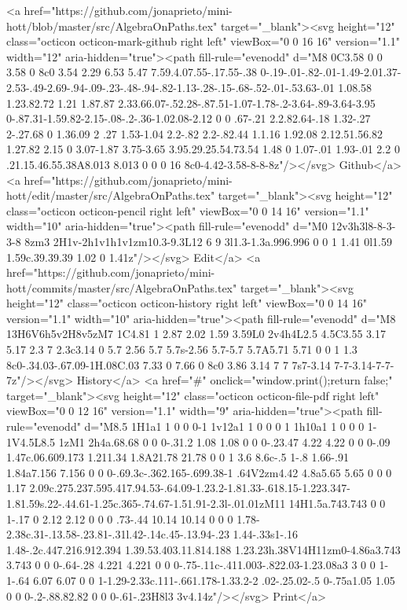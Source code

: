       <a href="https://github.com/jonaprieto/mini-hott/blob/master/src/AlgebraOnPaths.tex" target="_blank"><svg height="12" class="octicon octicon-mark-github right left" viewBox="0 0 16 16" version="1.1" width="12" aria-hidden="true"><path fill-rule="evenodd" d="M8 0C3.58 0 0 3.58 0 8c0 3.54 2.29 6.53 5.47 7.59.4.07.55-.17.55-.38 0-.19-.01-.82-.01-1.49-2.01.37-2.53-.49-2.69-.94-.09-.23-.48-.94-.82-1.13-.28-.15-.68-.52-.01-.53.63-.01 1.08.58 1.23.82.72 1.21 1.87.87 2.33.66.07-.52.28-.87.51-1.07-1.78-.2-3.64-.89-3.64-3.95 0-.87.31-1.59.82-2.15-.08-.2-.36-1.02.08-2.12 0 0 .67-.21 2.2.82.64-.18 1.32-.27 2-.27.68 0 1.36.09 2 .27 1.53-1.04 2.2-.82 2.2-.82.44 1.1.16 1.92.08 2.12.51.56.82 1.27.82 2.15 0 3.07-1.87 3.75-3.65 3.95.29.25.54.73.54 1.48 0 1.07-.01 1.93-.01 2.2 0 .21.15.46.55.38A8.013 8.013 0 0 0 16 8c0-4.42-3.58-8-8-8z"/></svg> Github</a>
      <a href="https://github.com/jonaprieto/mini-hott/edit/master/src/AlgebraOnPaths.tex" target="_blank"><svg height="12" class="octicon octicon-pencil right left" viewBox="0 0 14 16" version="1.1" width="10" aria-hidden="true"><path fill-rule="evenodd" d="M0 12v3h3l8-8-3-3-8 8zm3 2H1v-2h1v1h1v1zm10.3-9.3L12 6 9 3l1.3-1.3a.996.996 0 0 1 1.41 0l1.59 1.59c.39.39.39 1.02 0 1.41z"/></svg> Edit</a>
      <a href="https://github.com/jonaprieto/mini-hott/commits/master/src/AlgebraOnPaths.tex" target="_blank"><svg height="12" class="octicon octicon-history right left" viewBox="0 0 14 16" version="1.1" width="10" aria-hidden="true"><path fill-rule="evenodd" d="M8 13H6V6h5v2H8v5zM7 1C4.81 1 2.87 2.02 1.59 3.59L0 2v4h4L2.5 4.5C3.55 3.17 5.17 2.3 7 2.3c3.14 0 5.7 2.56 5.7 5.7s-2.56 5.7-5.7 5.7A5.71 5.71 0 0 1 1.3 8c0-.34.03-.67.09-1H.08C.03 7.33 0 7.66 0 8c0 3.86 3.14 7 7 7s7-3.14 7-7-3.14-7-7-7z"/></svg> History</a>
      <a  href="#" onclick="window.print();return false;" target="_blank"><svg height="12" class="octicon octicon-file-pdf right left" viewBox="0 0 12 16" version="1.1" width="9" aria-hidden="true"><path fill-rule="evenodd" d="M8.5 1H1a1 1 0 0 0-1 1v12a1 1 0 0 0 1 1h10a1 1 0 0 0 1-1V4.5L8.5 1zM1 2h4a.68.68 0 0 0-.31.2 1.08 1.08 0 0 0-.23.47 4.22 4.22 0 0 0-.09 1.47c.06.609.173 1.211.34 1.8A21.78 21.78 0 0 1 3.6 8.6c-.5 1-.8 1.66-.91 1.84a7.156 7.156 0 0 0-.69.3c-.362.165-.699.38-1 .64V2zm4.42 4.8a5.65 5.65 0 0 0 1.17 2.09c.275.237.595.417.94.53-.64.09-1.23.2-1.81.33-.618.15-1.223.347-1.81.59s.22-.44.61-1.25c.365-.74.67-1.51.91-2.3l-.01.01zM11 14H1.5a.743.743 0 0 1-.17 0 2.12 2.12 0 0 0 .73-.44 10.14 10.14 0 0 0 1.78-2.38c.31-.13.58-.23.81-.31l.42-.14c.45-.13.94-.23 1.44-.33s1-.16 1.48-.2c.447.216.912.394 1.39.53.403.11.814.188 1.23.23h.38V14H11zm0-4.86a3.743 3.743 0 0 0-.64-.28 4.221 4.221 0 0 0-.75-.11c-.411.003-.822.03-1.23.08a3 3 0 0 1-1-.64 6.07 6.07 0 0 1-1.29-2.33c.111-.661.178-1.33.2-2 .02-.25.02-.5 0-.75a1.05 1.05 0 0 0-.2-.88.82.82 0 0 0-.61-.23H8l3 3v4.14z"/></svg> Print</a>
